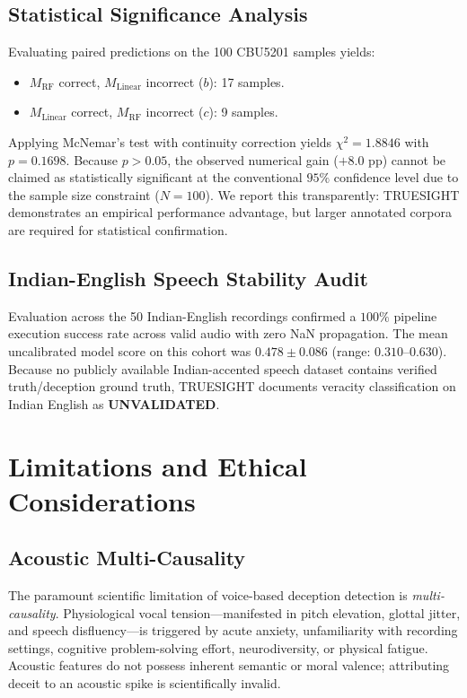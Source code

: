 \documentclass[conference]{IEEEtran}
\begin{document}
\subsection{Statistical Significance Analysis}
Evaluating paired predictions on the 100 CBU5201 samples yields:
\begin{itemize}
    \item $M_{\text{RF}}$ correct, $M_{\text{Linear}}$ incorrect ($b$): 17 samples.
    \item $M_{\text{Linear}}$ correct, $M_{\text{RF}}$ incorrect ($c$): 9 samples.
\end{itemize}
Applying McNemar's test with continuity correction yields $\chi^2 = 1.8846$ with $p = 0.1698$. Because $p > 0.05$, the observed numerical gain ($+8.0$ pp) cannot be claimed as statistically significant at the conventional $95\%$ confidence level due to the sample size constraint ($N=100$). We report this transparently: TRUESIGHT demonstrates an empirical performance advantage, but larger annotated corpora are required for statistical confirmation.

\subsection{Indian-English Speech Stability Audit}
Evaluation across the 50 Indian-English recordings confirmed a $100\%$ pipeline execution success rate across valid audio with zero NaN propagation. The mean uncalibrated model score on this cohort was $0.478 \pm 0.086$ (range: $0.310$--$0.630$). Because no publicly available Indian-accented speech dataset contains verified truth/deception ground truth, TRUESIGHT documents veracity classification on Indian English as \textbf{UNVALIDATED}.

\section{Limitations and Ethical Considerations}

\subsection{Acoustic Multi-Causality}
The paramount scientific limitation of voice-based deception detection is \textit{multi-causality}. Physiological vocal tension---manifested in pitch elevation, glottal jitter, and speech disfluency---is triggered by acute anxiety, unfamiliarity with recording settings, cognitive problem-solving effort, neurodiversity, or physical fatigue. Acoustic features do not possess inherent semantic or moral valence; attributing deceit to an acoustic spike is scientifically invalid.
\end{document}
